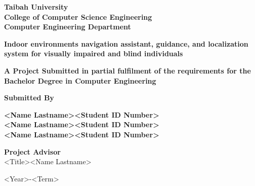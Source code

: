 \begin{titlepage}
    {\titlefont \textbf{Taibah University}}\\
    {\titlefont \textbf{College of Computer Science Engineering}}\\
    {\titlefont \textbf{Computer Engineering Department}}\\
    
    \vspace{1.8cm}
    
    {\titlefont \textbf{Indoor environments navigation assistant, guidance, and localization system for visually impaired and blind individuals}}
    
    \vspace{1.8cm}

    {\titlefont \fontsize{14}{16} \textbf{A Project Submitted in partial fulfilment of the requirements for the Bachelor Degree in Computer Engineering}}
    \vspace{1.8cm}
    
    {\titlefont \textbf{Submitted By}}\\
    \vspace{1cm}

    {\titlefont \textbf{\textless Name Lastname\textgreater \textless Student ID Number\textgreater}} \\[0.2cm]
    {\titlefont \textbf{\textless Name Lastname\textgreater \textless Student ID Number\textgreater}} \\[0.2cm]
    {\titlefont \textbf{\textless Name Lastname\textgreater \textless Student ID Number\textgreater}}
    \vspace{1.8cm}

    {\selectfont\fontsize{14}{16}\normalfont
    \textbf{Project Advisor}\\
    \textless Title\textgreater \textless Name Lastname\textgreater
    }
    
    \vspace{2cm}

    {\selectfont\fontsize{14}{16}\normalfont
    \textless Year\textgreater-\textless Term\textgreater
    }

\end{titlepage}
